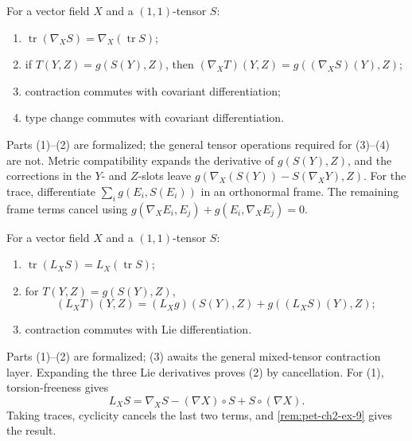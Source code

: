 \begin{remark}
  \label{rem:pet-ch2-ex-9}


  For a vector field $X$ and a $(1,1)$-tensor
  $S$:
  \begin{enumerate}
    \item $\operatorname{tr}(\nabla_XS)=\nabla_X(\operatorname{tr}S)$;
    \item if $T(Y,Z)=g(S(Y),Z)$, then
      $(\nabla_XT)(Y,Z)=g((\nabla_XS)(Y),Z)$;
    \item contraction commutes with covariant differentiation;
    \item type change commutes with covariant differentiation.
  \end{enumerate}
  Parts (1)--(2) are formalized; the general tensor operations required for
  (3)--(4) are not.
  \sketch
  Metric compatibility expands the derivative of $g(S(Y),Z)$, and the
  corrections in the $Y$- and $Z$-slots leave
  $g(\nabla_X(S(Y))-S(\nabla_XY),Z)$. For the trace, differentiate
  $\sum_i g(E_i,S(E_i))$ in an orthonormal frame. The remaining frame terms
  cancel using
  $g(\nabla_XE_i,E_j)+g(E_i,\nabla_XE_j)=0$.
\end{remark}

\begin{remark}
  \label{rem:pet-ch2-ex-10}


  For a vector field $X$ and a $(1,1)$-tensor
  $S$:
  \begin{enumerate}
    \item $\operatorname{tr}(L_XS)=L_X(\operatorname{tr}S)$;
    \item for $T(Y,Z)=g(S(Y),Z)$,
      \[
        (L_XT)(Y,Z)=(L_Xg)(S(Y),Z)+g((L_XS)(Y),Z);
      \]
    \item contraction commutes with Lie differentiation.
  \end{enumerate}
  Parts (1)--(2) are formalized; (3) awaits the general mixed-tensor
  contraction layer.
  \sketch
  Expanding the three Lie derivatives proves (2) by cancellation. For (1),
  torsion-freeness gives
  \[
    L_XS=\nabla_XS-(\nabla X)\circ S+S\circ(\nabla X).
  \]
  Taking traces, cyclicity cancels the last two terms, and
  \cref{rem:pet-ch2-ex-9} gives the result.
\end{remark}

